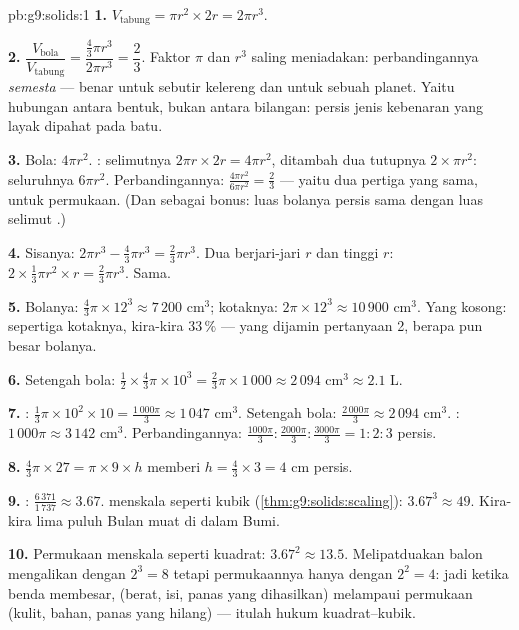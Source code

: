 \begin{solution}{pb:g9:solids:1}
\textbf{1.} $V_{\text{tabung}} = \pi r^2 \times 2r = 2\pi r^3$.

\textbf{2.} $\dfrac{V_{\text{bola}}}{V_{\text{tabung}}}
= \dfrac{\frac43 \pi r^3}{2 \pi r^3} = \dfrac23$. Faktor $\pi$ dan
$r^3$ saling meniadakan: perbandingannya \emph{semesta} --- benar
untuk sebutir kelereng dan untuk sebuah planet. Yaitu hubungan antara
bentuk, bukan antara bilangan: persis jenis kebenaran yang layak
dipahat pada batu.

\textbf{3.} Bola: $4\pi r^2$. : selimutnya
$2\pi r \times 2r = 4\pi r^2$, ditambah dua tutupnya
$2 \times \pi r^2$: seluruhnya $6\pi r^2$. Perbandingannya:
$\frac{4\pi r^2}{6\pi r^2} = \frac23$ --- yaitu dua pertiga yang sama,
untuk permukaan. (Dan sebagai bonus: luas bolanya persis sama dengan
luas selimut .)

\textbf{4.} Sisanya: $2\pi r^3 - \frac43\pi r^3 =
\frac23 \pi r^3$. Dua  berjari-jari $r$ dan tinggi $r$:
$2 \times \frac13 \pi r^2 \times r = \frac23 \pi r^3$. Sama.

\textbf{5.} Bolanya: $\frac43 \pi \times 12^3 \approx 7\,200$
cm$^3$; kotaknya: $2\pi \times 12^3 \approx 10\,900$ cm$^3$. Yang
kosong: sepertiga kotaknya, kira-kira $33\,\%$ --- yang dijamin
pertanyaan 2, berapa pun besar bolanya.

\textbf{6.} Setengah bola:
$\frac12 \times \frac43 \pi \times 10^3 = \frac23 \pi \times
1\,000 \approx 2\,094$ cm$^3 \approx 2.1$ L.

\textbf{7.} : $\frac13 \pi \times 10^2 \times 10 =
\frac{1\,000\pi}{3} \approx 1\,047$ cm$^3$. Setengah bola:
$\frac{2\,000\pi}{3} \approx 2\,094$ cm$^3$. :
$1\,000\pi \approx 3\,142$ cm$^3$. Perbandingannya:
$\frac{1000\pi}{3} : \frac{2000\pi}{3} : \frac{3000\pi}{3}
= 1 : 2 : 3$ persis.

\textbf{8.} $\frac43 \pi \times 27 = \pi \times 9 \times h$
memberi $h = \frac43 \times 3 = 4$ cm persis.

\textbf{9.} : $\frac{6\,371}{1\,737} \approx 3.67$.
 menskala seperti kubik (\cref{thm:g9:solids:scaling}):
$3.67^3 \approx 49$. Kira-kira lima puluh Bulan muat di dalam Bumi.

\textbf{10.} Permukaan menskala seperti kuadrat: $3.67^2 \approx
13.5$. Melipatduakan  balon mengalikan  dengan
$2^3 = 8$ tetapi permukaannya hanya dengan $2^2 = 4$: jadi ketika
benda membesar,  (berat, isi, panas yang dihasilkan) melampaui
permukaan (kulit, bahan, panas yang hilang) --- itulah hukum
kuadrat--kubik.


\end{solution}
